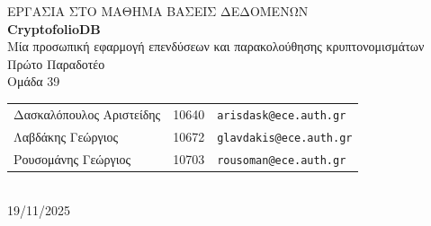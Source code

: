 \documentclass[a4paper,12pt]{article}
\begin{document}
\begin{center}
    {\Large ΕΡΓΑΣΙΑ ΣΤΟ ΜΑΘΗΜΑ ΒΑΣΕΙΣ ΔΕΔΟΜΕΝΩΝ}\\[3cm]

    {\Large \textbf{CryptofolioDB}}\\[0.5cm]

    {\large Μία προσωπική εφαρμογή επενδύσεων και παρακολούθησης κρυπτονομισμάτων }\\[3cm]

    {\Large Πρώτο Παραδοτέο}\\[3cm]

    {\large Ομάδα 39}\\[1cm]

    \begin{tabular}{l l l}
        Δασκαλόπουλος Αριστείδης & 10640 & \texttt{arisdask@ece.auth.gr} \\
        Λαβδάκης Γεώργιος & 10672 & \texttt{glavdakis@ece.auth.gr} \\
        Ρουσομάνης Γεώργιος & 10703 & \texttt{rousoman@ece.auth.gr} \\
    \end{tabular}\\[3cm]

    {\large 19/11/2025}
\end{center}

\newpage

\tableofcontents

\newpage






\end{document}

